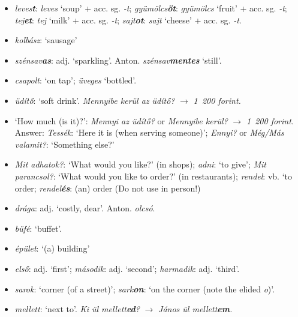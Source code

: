 \documentclass[a4paper,11pt]{article}
\begin{document}
\begin{itemize}
  \item \emph{leves\textbf{t}}: \emph{leves} `soup' +
    acc. sg. \emph{-t}; \emph{gyümölcs\textbf{öt}}: \emph{gyümölcs}
    `fruit' + acc. sg. \emph{-t}; \emph{tej\textbf{et}}: \emph{tej}
    `milk' + acc. sg. \emph{-t}; \emph{sajt\textbf{ot}}: \emph{sajt}
    `cheese' + acc. sg. \emph{-t}.

  \item \emph{kolbász}: `sausage'

  \item \emph{szénsav\textbf{as}}:
    adj. `sparkling'. Anton. \emph{szénsav\textbf{mentes}} `still'.

  \item \emph{csapolt}: `on tap'; \emph{üveges} `bottled'.

  \item \emph{üdítő}: `soft drink'. \emph{Mennyibe kerül az üdítő?}
    $\rightarrow$ \emph{1\ 200 forint.}

  \item `How much (is it)?': \emph{Mennyi az üdítő?} or \emph{Mennyibe
  kerül?} $\rightarrow$ \emph{1\ 200 forint.} Answer: \emph{Tessék}:
    `Here it is (when serving someone)'; \emph{Ennyi?}  or
    \emph{Még/Más valamit?}: `Something else?'

  \item \emph{Mit adhatok?}: `What would you like?' (in shops);
    \emph{adni}: `to give'; \emph{Mit parancsol?}: `What would you
    like to order?' (in restaurants); \emph{rendel}: vb. `to order;
    \emph{rendel\textbf{és}}: (an) order (Do not use in person!)

  \item \emph{drága}: adj. `costly, dear'. Anton. \emph{olcsó}.

  \item \emph{büfé}: `buffet'.

  \item \emph{épület}: `(a) building'

  \item \emph{első}: adj. `first'; \emph{második}: adj. `second';
    \emph{harmadik}: adj. `third'.

  \item \emph{sarok}: `corner (of a street)'; \emph{sark\textbf{on}}: `on
    the corner (note the elided \emph{o})'.

  \item \emph{mellett}: `next to'. \emph{Ki ül mellett\textbf{ed}?}
    $\rightarrow$ \emph{János ül mellett\textbf{em}.}


\end{itemize}
\end{document}
